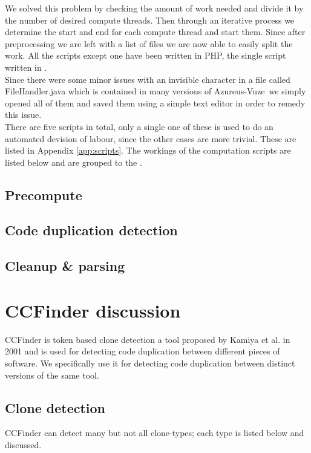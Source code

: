 \documentclass[a4paper,twoside,11pt]{article}
\newcommand{\av}{{\sc Azureus-Vuze}~}
\begin{document}
We solved this problem by checking the amount of work needed and divide it by the number of desired compute threads. Then through an iterative process we determine the start and end for each compute thread and start them. Since after preprocessing we are left with a list of files we are now able to easily split the work. All the scripts except one have been written in {\sc PHP}\cite{url:php}, the single script written in . \\

Since there were some minor issues with an invisible character in a file called {\sc FileHandler.java} which is contained in many versions of \av we simply opened all of them and saved them using a simple text editor in order to remedy this issue. \\

There are five scripts in total, only a single one of these is used to do an automated devision of labour, since the other cases are more trivial. These are listed in Appendix \ref{app:scripts}. The workings of the computation scripts are listed below and are grouped to the .

\subsection{Precompute}

\subsection{Code duplication detection}

\subsection{Cleanup \& parsing}


\section{CCFinder discussion}
\label{sec:ccfinderdiscussion}
CCFinder is token based clone detection a tool proposed by Kamiya et al.\cite{pap:ccfinder} in 2001 and is used for detecting code duplication between different pieces of software. We specifically use it for detecting code duplication between distinct versions of the same tool. 


\subsection{Clone detection}
\label{sec:cloneDetection}
CCFinder can detect many but not all clone-types; each type is listed below and discussed.
\end{document}
